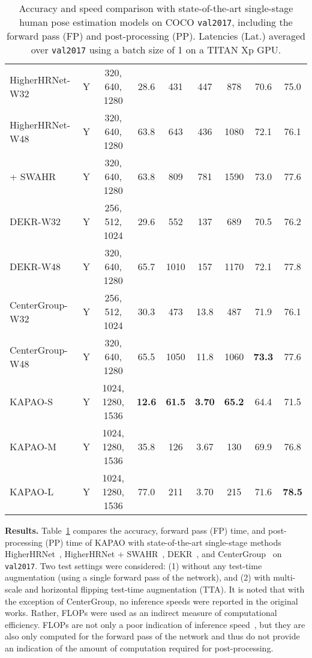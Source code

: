 \documentclass[runningheads]{llncs}
\newcommand\hll[1]{\bgroup
  \hskip0pt\color{black}#1\egroup
}
\newcommand\hlll[1]{\bgroup
  \hskip0pt\color{black}#1\egroup
}
\begin{document}
\begin{table}[t]
\begin{tabular}{l|c|c|c|cc|c|c|c}
HigherHRNet-W32~\cite{cheng2020higherhrnet} & Y & 320, 640, 1280 & 28.6 & 431 & 447 & 878 & 70.6 & 75.0\\  HigherHRNet-W48~\cite{cheng2020higherhrnet} & Y & 320, 640, 1280 & 63.8 & 643 & 436 & 1080 & 72.1 & 76.1\\  \hll{\quad + SWAHR~\cite{luo2021rethinking}} & Y & 320, 640, 1280 & 63.8 & 809 & 781 & 1590 & 73.0 & 77.6\\
DEKR-W32~\cite{geng2021bottom} & Y & 256, 512, 1024 & 29.6 & 552 & 137 & 689 & 70.5 & 76.2\\  DEKR-W48~\cite{geng2021bottom} & Y & 320, 640, 1280 & 65.7 & 1010 & 157 & 1170 & 72.1 & 77.8\\
	\hll{CenterGroup-W32~\cite{braso2021center}} & Y & 256, 512, 1024 & 30.3 & 473 & 13.8 & 487 & 71.9 & 76.1\\
\hll{CenterGroup-W48~\cite{braso2021center}} & Y & 320, 640, 1280 & 65.5 & 1050 & 11.8 & 1060 & \textbf{73.3} & 77.6\\
KAPAO-S & Y & 1024, 1280, 1536 & \textbf{12.6} & \textbf{61.5} & \textbf{3.70} & \textbf{65.2} & 64.4 & 71.5\\  KAPAO-M & Y & 1024, 1280, 1536 & 35.8 & 126 & 3.67 & 130 & 69.9 & 76.8 \\
	KAPAO-L & Y & 1024, 1280, 1536 & 77.0 & 211 & 3.70 & 215 & 71.6 & \textbf{78.5} \\
	\hline
\end{tabular}
\smallskip
\caption{Accuracy and speed comparison with state-of-the-art single-stage human pose estimation models on COCO \texttt{val2017}, including the forward pass (FP) and post-processing (PP). Latencies (Lat.) averaged over \texttt{val2017} using a batch size of 1 on a TITAN Xp GPU.} 
\label{tab:kapao_coco_val}
\end{table}

\medskip\noindent\textbf{Results.} Table~\ref{tab:kapao_coco_val} compares the accuracy, forward pass (FP) time, and post-processing (PP) time of KAPAO with state-of-the-art single-stage methods HigherHRNet~\cite{cheng2020higherhrnet}, \hll{HigherHRNet + SWAHR~\cite{luo2021rethinking}, DEKR~\cite{geng2021bottom}, and CenterGroup~\cite{braso2021center}} on \texttt{val2017}. Two test settings were considered: (1) without any test-time augmentation (using a single forward pass of the network), and (2) with multi-scale and horizontal flipping test-time augmentation (TTA). It is noted that with the exception of CenterGroup, no inference speeds were reported in the original works. Rather, FLOPs were used as an indirect measure of computational efficiency. FLOPs are not only a poor indication of inference speed~\cite{ding2021repvgg}, but they are also only computed for the forward pass of the network and \hlll{thus} do not provide an indication of the amount of computation required for post-processing.
\end{document}
